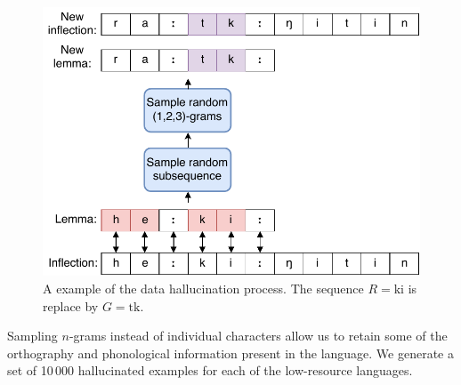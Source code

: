 \documentclass[11pt,a4paper]{article}
\begin{document}
\begin{figure}[h]
\centering
\includegraphics[scale=0.5]{hall.pdf}
\caption{\label{fig:hall} A example of the data hallucination process. The sequence $R=\text{ki}$ is replace by $G=\text{tk}$.}
\end{figure}


Sampling $n$-grams instead of individual characters allow us to retain
some of the orthography and phonological information present in the
language.  We generate a set of 10\,000 hallucinated examples for each
of the low-resource languages.


\end{document}
